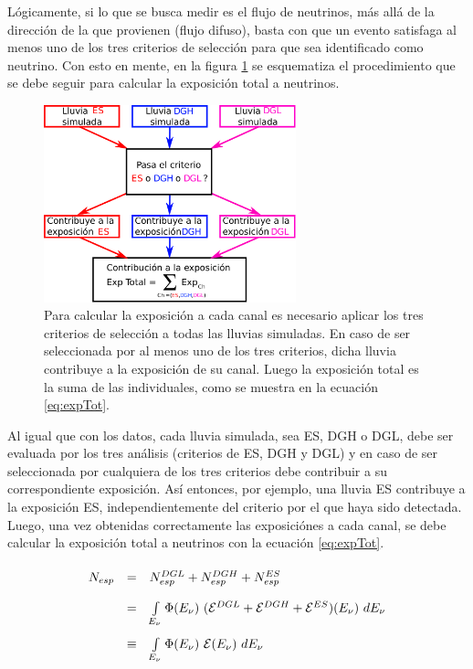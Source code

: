 	L\'ogicamente, si lo que se busca medir es el flujo de neutrinos, m\'as all\'a de la dirección de la que provienen (flujo difuso), basta con que un evento satisfaga al menos uno de los tres criterios de selección para que sea identificado como neutrino.
	Con esto en mente, en la figura \ref{fig:sketch_combined} se esquematiza el procedimiento que se debe seguir para calcular la exposición total a neutrinos.
	\begin{figure}[ht!]
		\begin{center}
			\includegraphics[width=0.65\textwidth]{fig/resultadosAuger/sketch_combined_5}
			\caption{Para calcular la exposición a cada canal es necesario aplicar los tres criterios de selección a todas las lluvias simuladas. En caso de ser seleccionada por al menos uno de los tres criterios, dicha lluvia contribuye a la exposición de su canal. Luego la exposición total es la suma de las individuales, como se muestra en la ecuación \ref{eq:expTot}.}
			\label{fig:sketch_combined}
		\end{center}
	\end{figure}
	Al igual que con los datos, cada lluvia simulada, sea ES, DGH o DGL, debe ser evaluada por los tres análisis (criterios de ES, DGH y DGL) y en caso de ser seleccionada por cualquiera de los tres criterios debe contribuir a su correspondiente exposición.
	As\'i entonces, por ejemplo, una lluvia ES contribuye a la exposici\'on ES, independientemente del criterio por el que haya sido detectada.
	Luego, una vez obtenidas correctamente las exposiciónes a cada canal, se debe calcular la exposición total a neutrinos con la ecuación \ref{eq:expTot}.
	\begin{equation}\renewcommand{\arraystretch}{2}
	\begin{array}{rcl}
	 N_{esp}& =& N_{esp}^{DGL}+N_{esp}^{DGH}+N_{esp}^{ES} \\
	 & = & \int\limits_{E_\nu}\Phi(E_\nu)~({\cal E}^{DGL}+{\cal E}^{DGH}+{\cal E}^{ES})(E_\nu)~dE_\nu\\
	 & \equiv & \int\limits_{E_\nu}\Phi(E_\nu)~{\cal E}(E_\nu)~dE_\nu
	\end{array}
	\label{eq:expTot}
	\end{equation}
	
